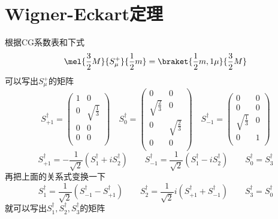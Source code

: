 \chapter{Wigner-Eckart定理}
\label{wigner-eckart}
根据CG系数表和下式
\begin{equation}
	\mel{\frac{3}{2}M}{S^{+}_{\mu}}{\frac{1}{2}m}=\braket{\frac{1}{2}m,1\mu}{\frac{3}{2}M}
\end{equation}
可以写出$S^{+}_{\mu}$的矩阵
\begin{equation}
	S_{+1}^{\dagger}=
	\begin{pmatrix}
		1 & 0 \\
		0 & \sqrt{\frac{1}{3}} \\
		0 & 0 \\
		0 & 0 \\
	\end{pmatrix}\quad
	S_{0}^{\dagger}=
	\begin{pmatrix}
		0 & 0 \\
		\sqrt{\frac{2}{3}} & 0 \\
		0 & \sqrt{\frac{2}{3}} \\
		0 & 0 \\
	\end{pmatrix}\quad
	S_{-1}^{\dagger}=
	\begin{pmatrix}
		0 & 0 \\
		0 & 0 \\
		\sqrt{\frac{1}{3}} & 0 \\
		0 & 1 \\
	\end{pmatrix}
\end{equation}
\begin{equation}
	S_{+1}^{\dagger}=-\frac{1}{\sqrt{2}}(S^{\dagger}_{1}+iS_{2}^{\dagger})\qquad S_{-1}^{\dagger}=\frac{1}{\sqrt{2}}(S_{1}^{\dagger}-iS_{2}^{\dagger})\qquad S_{0}^{\dagger}=S_{3}^{\dagger}
\end{equation}
再把上面的关系式变换一下
\begin{equation}
	S_{1}^{\dagger}=\frac{1}{\sqrt{2}}(S_{-1}^{\dagger}-S_{+1}^{\dagger})\qquad S_{2}^{\dagger}=\frac{1}{\sqrt{2}}i(S_{+1}^{\dagger}+S_{-1}^{\dagger})\qquad S_{3}^{\dagger}=S_{0}^{\dagger}
\end{equation}
就可以写出$S^{\dagger}_{1},S^{\dagger}_{2},S^{\dagger}_{3}$的矩阵
